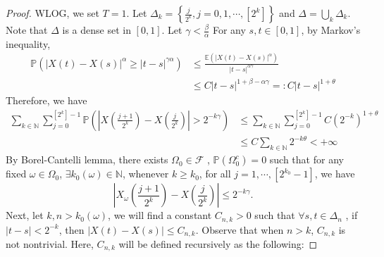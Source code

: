 \documentclass[11pt,english]{smfart}
\newcommand{\mb}{\mathbb}
\newcommand{\mc}{\mathcal}
\begin{document}
\begin{proof}
    WLOG, we set $T=1$. Let $\Delta_k = \left\{\frac{j}{2^k}, j = 0,1,\cdots,[2^k]\right\}$ and $\Delta = \bigcup_k \Delta_k$. Note that $\Delta$ is a dense set in $[0,1]$. Let $\gamma < \frac{\beta}{\alpha}$ For any $s,t\in [0,1]$, by Markov's inequality,  \begin{align*}
        \mb{P}\left(|X(t) - X(s)|^\alpha \geq |t-s|^{\gamma\alpha} \right) &\leq \frac{\mb{E}\left(|X(t) - X(s)|^\alpha\right)}{|t-s|^{\alpha \gamma}} \\
        &\leq C|t-s|^{1+\beta - \alpha\gamma} =: C|t-s|^{1+\theta}
    \end{align*}
    Therefore, we have \begin{align*}
        \sum_{k\in\mb{N}} \sum_{j=0}^{[2^k]-1} \mb{P}\left(\left|X\left(\frac{j+1}{2^k}\right) - X\left(\frac{j}{2^k}\right)\right| > 2^{-k\gamma}\right) &\leq \sum_{k\in \mb{N}} \sum_{j=0}^{[2^k]-1} C(2^{-k})^{1+\theta} \\
        &\leq C\sum_{k\in \mb{N}} 2^{-k\theta} <+\infty
    \end{align*}
    By Borel-Cantelli lemma, there exists $\Omega_0 \in \mc{F}$ , $\mb{P}\left(\Omega_0^c\right) = 0$ such that for any fixed $\omega \in \Omega_0$, $\exists k_0(\omega) \in \mb{N}$, whenever  $k\geq k_0$, for all $j = 1,\cdots,[2^{k_0}-1]$, we have $$\left|X_\omega\left(\frac{j+1}{2^k}\right) - X\left(\frac{j}{2^k}\right)\right| \leq 2^{-k\gamma}.$$
    Next, let $k,n > k_0(\omega)$, we will find a constant $C_{n,k} > 0$ such that $\forall s,t \in \Delta_n$ , if $|t-s|< 2^{-k}$, then $|X(t)-X(s)| \leq C_{n,k}$. Observe that when $n>k$, $C_{n,k}$ is not nontrivial. Here, $C_{n,k}$ will be defined recursively as the following:


\end{proof}
\end{document}
